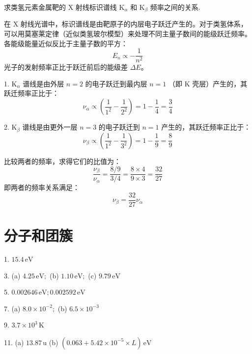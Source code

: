 \pagebreak[4]
\begin{exercise}\label{ex:25.11}
求类氢元素金属靶的 $\mathrm{X}$ 射线标识谱线 $\mathrm{K}_\alpha$ 和 $\mathrm{K}_\beta$ 频率之间的关系.
\end{exercise}
\begin{solution}
在 $\mathrm{X}$ 射线光谱中，标识谱线是由靶原子的内层电子跃迁产生的。对于类氢体系，可以用莫塞莱定律（近似类氢玻尔模型）来处理不同主量子数间的能级跃迁频率。各能级能量近似反比于主量子数的平方：
$$ E_n \propto - \frac{1}{n^2} $$
光子的发射频率正比于跃迁前后的能级差 $\Delta E$。

1. $\mathrm{K}_\alpha$ 谱线是由外层 $n=2$ 的电子跃迁到最内层 $n=1$ （即 K 壳层）产生的，其跃迁频率正比于：
$$ \nu_\alpha \propto \left( \frac{1}{1^2} - \frac{1}{2^2} \right) = 1 - \frac{1}{4} = \frac{3}{4} $$

2. $\mathrm{K}_\beta$ 谱线是由更外一层 $n=3$ 的电子跃迁到 $n=1$ 产生的，其跃迁频率正比于：
$$ \nu_\beta \propto \left( \frac{1}{1^2} - \frac{1}{3^2} \right) = 1 - \frac{1}{9} = \frac{8}{9} $$

比较两者的频率，求得它们的比值为：
$$ \frac{\nu_\beta}{\nu_\alpha} = \frac{8/9}{3/4} = \frac{8 \times 4}{9 \times 3} = \frac{32}{27} $$
即两者的频率关系满足：
$$ \nu_\beta = \frac{32}{27} \nu_\alpha $$
\end{solution}



\chapter{分子和团簇}

\begin{oddanswers}
1. $15.4\,\mathrm{eV}$

3. (a) $4.25\,\mathrm{eV};$ (b) $1.10\,\mathrm{eV};$ (c) $9.79\,\mathrm{eV}$

5. $0.002646\,\mathrm{eV}; 0.002592\,\mathrm{eV}$

7. (a) $8.0 \times 10^{-2};$ (b) $6.5 \times 10^{-3}$

9. $3.7 \times 10^3\,\mathrm{K}$

11. (a) $13.87\,\mathrm{u}$
(b) $(0.063 + 5.42 \times 10^{-5} \times L)\,\mathrm{eV}$
\end{oddanswers}

